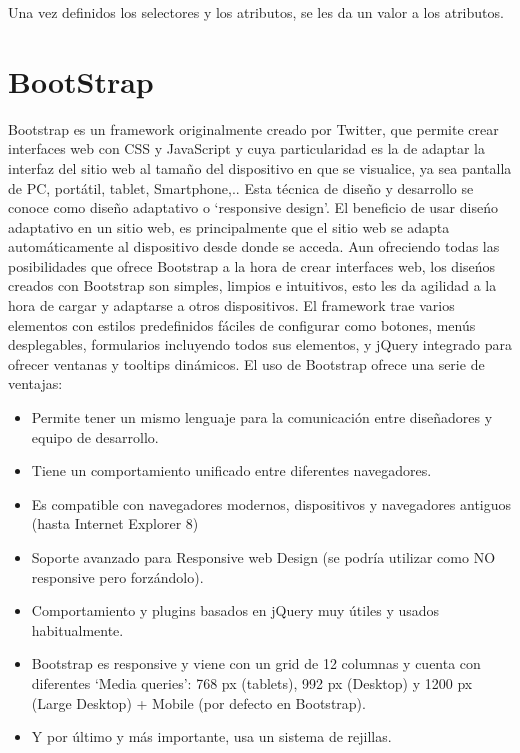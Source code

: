 \documentclass[a4paper, 12pt]{book}
\begin{document}
Una vez definidos los selectores y los atributos, se les da un valor a los atributos. 


\section{BootStrap}
\label{sec:bootstrap}
Bootstrap es un framework originalmente creado por Twitter, que permite crear interfaces web con CSS y JavaScript y cuya particularidad es la de adaptar 
la interfaz del sitio web al tama\~no del dispositivo en que se visualice, ya sea pantalla de PC, port\'atil, tablet, Smartphone,.. 
Esta t\'ecnica de dise\~no y desarrollo se conoce como dise\~no adaptativo o `responsive design'.
El beneficio de usar dise\'no adaptativo en un sitio web, es principalmente que el sitio web se adapta autom\'aticamente al dispositivo desde donde 
se acceda. Aun ofreciendo todas las posibilidades que ofrece Bootstrap a la hora de crear interfaces web, los dise\'nos creados con Bootstrap son 
simples, limpios e intuitivos, esto les da agilidad a la hora de cargar y adaptarse a otros dispositivos. El framework trae varios elementos con 
estilos predefinidos f\'aciles de configurar como botones, men\'us desplegables, formularios incluyendo todos sus elementos, y jQuery integrado para 
ofrecer ventanas y tooltips din\'amicos.
El uso de Bootstrap ofrece una serie de ventajas:
\begin{itemize}
  \item Permite tener un mismo lenguaje para la comunicaci\'on entre dise\~nadores y equipo de desarrollo.
  \item Tiene un comportamiento unificado entre diferentes navegadores.
  \item Es compatible con navegadores modernos, dispositivos y navegadores antiguos (hasta Internet Explorer 8)
  \item Soporte avanzado para Responsive web Design (se podr\'ia utilizar como NO responsive pero forz\'andolo).
  \item Comportamiento y plugins basados en jQuery muy \'utiles y usados habitualmente.
  \item Bootstrap es responsive y viene con un grid de 12 columnas y cuenta con diferentes `Media queries': 768 px (tablets), 992 px (Desktop) y 
  1200 px (Large Desktop) + Mobile (por defecto en Bootstrap).
  \item Y por \'ultimo y m\'as importante, usa un sistema de rejillas.
\end{itemize}
\end{document}
